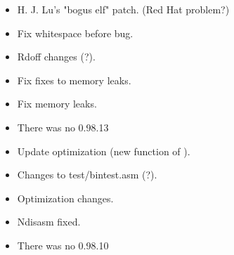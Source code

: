 
\begin{itemize}
    \item{H. J. Lu's "bogus elf" patch. (Red Hat problem?)}
\end{itemize}



\begin{itemize}
    \item{Fix whitespace before  bug.}
\end{itemize}


\begin{itemize}
    \item{Rdoff changes (?).}
    \item{Fix fixes to memory leaks.}
\end{itemize}


\begin{itemize}
    \item{Fix memory leaks.}
\end{itemize}


\begin{itemize}
    \item{There was no 0.98.13}
\end{itemize}



\begin{itemize}
    \item{Update optimization (new function of ).}
    \item{Changes to test/bintest.asm (?).}
\end{itemize}


\begin{itemize}
    \item{Optimization changes.}
    \item{Ndisasm fixed.}
\end{itemize}


\begin{itemize}
    \item{There was no 0.98.10}
\end{itemize}

